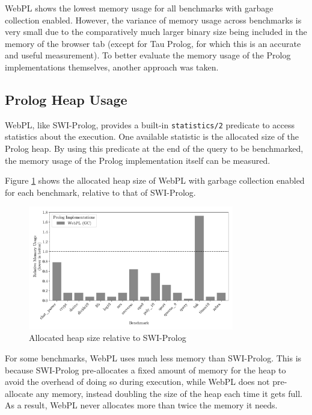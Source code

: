 WebPL shows the lowest memory usage for all benchmarks with garbage collection enabled. However, the variance of memory usage across benchmarks is very small due to the comparatively much larger binary size being included in the memory of the browser tab (except for Tau Prolog, for which this is an accurate and useful measurement). To better evaluate the memory usage of the Prolog implementations themselves, another approach was taken.

\subsection{Prolog Heap Usage}

\label{sec:prolog-heap-usage}

WebPL, like SWI-Prolog, provides a built-in \texttt{statistics/2} predicate to access statistics about the execution. One available statistic is the allocated size of the Prolog heap. By using this predicate at the end of the query to be benchmarked, the memory usage of the Prolog implementation itself can be measured.

Figure \ref{fig:heap-usage} shows the allocated heap size of WebPL with garbage collection enabled for each benchmark, relative to that of SWI-Prolog.

\begin{figure}[H]
\centering
\includegraphics[width=0.8\textwidth]{relative_memory_builtin.pdf}
\caption{Allocated heap size relative to SWI-Prolog}
\label{fig:heap-usage}
\end{figure}

For some benchmarks, WebPL uses much less memory than SWI-Prolog. This is because SWI-Prolog pre-allocates a fixed amount of memory for the heap to avoid the overhead of doing so during execution, while WebPL does not pre-allocate any memory, instead doubling the size of the heap each time it gets full. As a result, WebPL never allocates more than twice the memory it needs.

